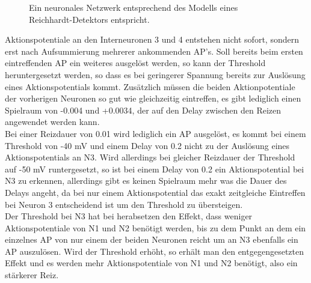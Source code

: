 \documentclass[11pt]{article}
\begin{document}
\begin{figure}[H]
\caption{Ein neuronales Netzwerk entsprechend des Modells eines Reichhardt-Detektors entspricht.}
\label{reich}
\end{figure}

Aktionspotentiale an den Interneuronen 3 und 4 entstehen nicht sofort, sondern erst nach Aufsummierung mehrerer ankommenden AP's. Soll bereits beim ersten eintreffenden AP ein weiteres ausgelöst werden, so kann der Threshold heruntergesetzt werden, so dass es bei geringerer Spannung bereits zur Auslösung eines Aktionspotentials kommt. Zusätzlich müssen die beiden Aktionpotentiale der vorherigen Neuronen so gut wie gleichzeitig eintreffen, es gibt lediglich einen Spielraum von -0.004 und +0.0034, der auf den Delay zwischen den Reizen angewendet werden kann.\\
Bei einer Reizdauer von 0.01 wird lediglich ein AP ausgelöst, es kommt bei einem Threshold von -40 mV und einem Delay von 0.2 nicht zu der Auslösung eines Aktionspotentials an N3. Wird allerdings bei gleicher Reizdauer der Threshold auf -50 mV runtergesetzt, so ist bei einem Delay von 0.2 ein Aktionspotential bei N3 zu erkennen, allerdings gibt es keinen Spielraum mehr was die Dauer des Delays angeht, da bei nur einem Aktionspotential das exakt zeitgleiche Eintreffen bei Neuron 3 entscheidend ist um den Threshold zu übersteigen.\\
Der Threshold bei N3 hat bei herabsetzen den Effekt, dass weniger Aktionspotentiale von N1 und N2 benötigt werden, bis zu dem Punkt an dem ein einzelnes AP von nur einem der beiden Neuronen reicht um an N3 ebenfalls ein AP auszulösen. Wird der Threshold erhöht, so erhält man den entgegengesetzten Effekt und es werden mehr Aktionspotentiale von N1 und N2 benötigt, also ein stärkerer Reiz.
\end{document}
